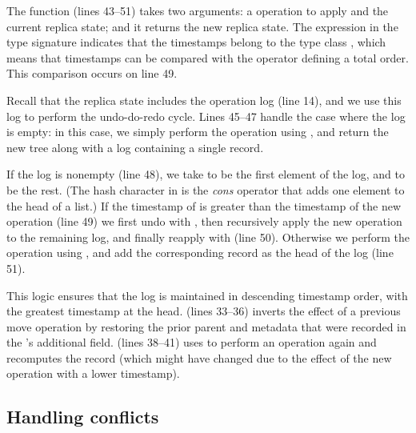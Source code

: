 \documentclass[sigconf]{acmart}
\begin{document}
The  function (lines 43--51) takes two arguments: a  operation to apply and the current replica state; and it returns the new replica state.
The expression  in the type signature indicates that the timestamps  belong to the type class , which means that timestamps can be compared with the \isa{<} operator defining a total order.
This comparison occurs on line 49.

Recall that the replica state includes the operation log (line 14), and we use this log to perform the undo-do-redo cycle.
Lines 45--47 handle the case where the log is empty: in this case, we simply perform the operation using , and return the new tree along with a log containing a single  record.

If the log is nonempty (line 48), we take  to be the first element of the log, and  to be the rest.
(The hash character in  is the \emph{cons} operator that adds one element to the head of a list.)
If the timestamp of  is greater than the timestamp of the new operation (line 49) we first undo  with , then recursively apply the new operation to the remaining log, and finally reapply  with  (line 50).
Otherwise we perform the operation using , and add the corresponding  record as the head of the log (line 51).

This logic ensures that the log is maintained in descending timestamp order, with the greatest timestamp at the head.
 (lines 33--36) inverts the effect of a previous move operation by restoring the prior parent and metadata that were recorded in the 's additional field.
 (lines 38--41) uses  to perform an operation again and recomputes the  record (which might have changed due to the effect of the new operation with a lower timestamp).

\subsection{Handling conflicts}\label{sec:conflicts}
\end{document}
